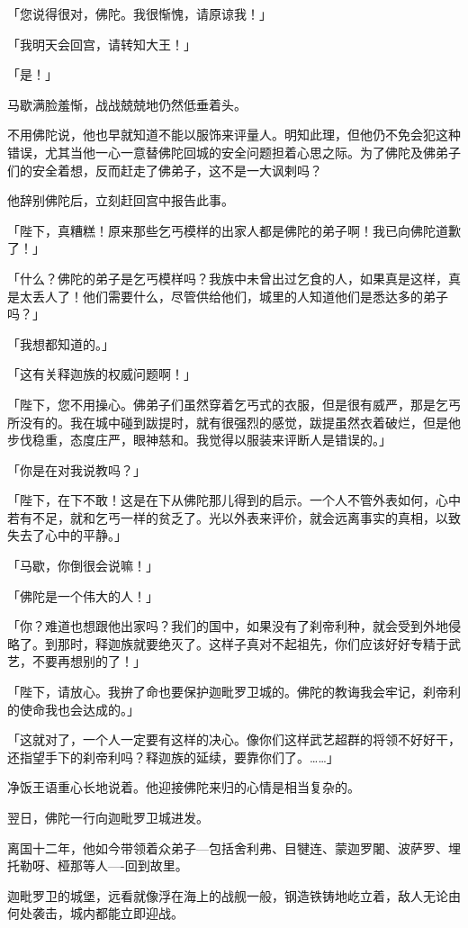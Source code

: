 \documentclass[twoside,openany]{book}
\begin{document}
「您说得很对，佛陀。我很惭愧，请原谅我！」

「我明天会回宫，请转知大王！」

「是！」

马歇满脸羞惭，战战兢兢地仍然低垂着头。

不用佛陀说，他也早就知道不能以服饰来评量人。明知此理，但他仍不免会犯这种错误，尤其当他一心一意替佛陀回城的安全问题担着心思之际。为了佛陀及佛弟子们的安全着想，反而赶走了佛弟子，这不是一大讽剌吗？

他辞别佛陀后，立刻赶回宫中报告此事。

「陛下，真糟糕！原来那些乞丐模样的出家人都是佛陀的弟子啊！我已向佛陀道歉了！」

「什么？佛陀的弟子是乞丐模样吗？我族中未曾出过乞食的人，如果真是这样，真是太丢人了！他们需要什么，尽管供给他们，城里的人知道他们是悉达多的弟子吗？」

「我想都知道的。」

「这有关释迦族的权威问题啊！」

「陛下，您不用操心。佛弟子们虽然穿着乞丐式的衣服，但是很有威严，那是乞丐所没有的。我在城中碰到跋提时，就有很强烈的感觉，跋提虽然衣着破烂，但是他步伐稳重，态度庄严，眼神慈和。我觉得以服装来评断人是错误的。」

「你是在对我说教吗？」

「陛下，在下不敢！这是在下从佛陀那儿得到的启示。一个人不管外表如何，心中若有不足，就和乞丐一样的贫乏了。光以外表来评价，就会远离事实的真相，以致失去了心中的平静。」

「马歇，你倒很会说嘛！」

「佛陀是一个伟大的人！」

「你？难道也想跟他出家吗？我们的国中，如果没有了刹帝利种，就会受到外地侵略了。到那时，释迦族就要绝灭了。这样子真对不起祖先，你们应该好好专精于武艺，不要再想别的了！」

「陛下，请放心。我拚了命也要保护迦毗罗卫城的。佛陀的教诲我会牢记，刹帝利的使命我也会达成的。」

「这就对了，一个人一定要有这样的决心。像你们这样武艺超群的将领不好好干，还指望手下的刹帝利吗？释迦族的延续，要靠你们了。……」

净饭王语重心长地说着。他迎接佛陀来归的心情是相当复杂的。

翌日，佛陀一行向迦毗罗卫城进发。

离国十二年，他如今带领着众弟子---包括舍利弗、目犍连、蒙迦罗闍、波萨罗、埋托勒呀、桠那等人----回到故里。

迦毗罗卫的城堡，远看就像浮在海上的战舰一般，钢造铁铸地屹立着，敌人无论由何处袭击，城内都能立即迎战。
\end{document}
